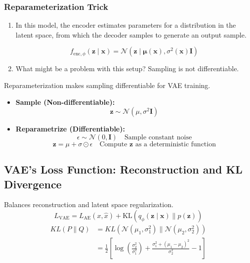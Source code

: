 \subsubsection{Reparameterization Trick}
\begin{motivation}
    \begin{enumerate}
        \item In this model, the encoder estimates parameters for a distribution in the latent space, from which the decoder samples to generate an output sample.

        \[
        f_{\text{enc}, \phi}(\mathbf{z} \mid \mathbf{x}) = \mathcal{N}(\mathbf{z} \mid \boldsymbol{\mu}(\mathbf{x}), \sigma^2(\mathbf{x}) \mathbf{I})
        \]        
        \item What might be a problem with this setup? Sampling is not differentiable.
    \end{enumerate}
\end{motivation}
\begin{definition}
    Reparameterization makes sampling differentiable for VAE training.
    \begin{itemize}
        \item \textbf{Sample (Non-differentiable):}
        \[
        \mathbf{z} \sim \mathcal{N}(\mu, \sigma^2 \mathbf{I})
        \]
        
        \item \textbf{Reparametrize (Differentiable):}
        \[
        \epsilon \sim \mathcal{N}(0, \mathbf{I}) \quad \text{Sample constant noise}
        \]
        \[
        \mathbf{z} = \mu + \sigma \odot \epsilon \quad \text{Compute } \mathbf{z} \text{ as a deterministic function}
        \]
    \end{itemize}
\end{definition}

\subsection{VAE's Loss Function: Reconstruction and KL Divergence}
\begin{definition}
    Balances reconstruction and latent space regularization.
    \begin{equation}
        L_{\text{VAE}} = L_{\text{AE}} (x, \hat{x}) + \text{KL} (q_\phi (\mathbf{z} \mid \mathbf{x}) \parallel p(\mathbf{z}))
    \end{equation}
    \begin{align*}
        KL(P \| Q) &= KL\left(\mathcal{N}(\mu_1, \sigma_1^2) \| \mathcal{N}(\mu_2, \sigma_2^2)\right) \\
        &= \frac{1}{2} \left[ \log\left(\frac{\sigma_2^2}{\sigma_1^2}\right) 
        + \frac{\sigma_1^2 + (\mu_1 - \mu_2)^2}{\sigma_2^2} - 1 \right]
    \end{align*}
\end{definition}


